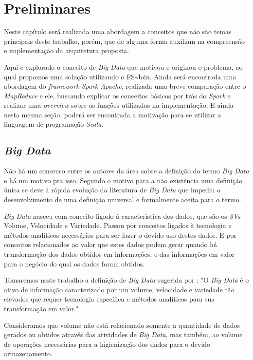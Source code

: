 \chapter{Preliminares}
\label{cap:cap1}

Neste capítulo será realizada uma abordagem a conceitos que não são temas principais deste trabalho, porém, que de alguma forma auxiliam na compreensão e implementação da arquitetura proposta.

Aqui é explorado o conceito de \textit{Big Data} que motivou e originou o problema, ao qual propomos uma solução utilizando o FS-Join. Ainda será encontrada uma abordagem do \textit{framework} \textit{Spark Apache}, realizada uma breve comparação entre o \textit{MapReduce} e ele, buscando explicar os conceitos básicos por trás do \textit{Spark} e realizar uma \textit{overview} sobre as funções utilizadas na implementação. E ainda nesta mesma seção, poderá ser encontrada a motivação para se utilizar a linguagem de programação \textit{Scala}.

\section{\textit{Big Data}}

Não há um consenso entre os autores da área sobre a definição do termo \textit{Big Data} e há um motivo pra isso. Segundo \cite{doi:10.1108/LR-06-2015-0061} o motivo para a não existência uma definição única se deve à rápida evolução da literatura de \textit{Big Data} que impediu o desenvolvimento de uma definição universal e formalmente aceita para o termo.

\textit{Big Data} nasceu com conceito ligado à característica dos dados, que são os \textit{3Vs} -- Volume, Velocidade e Variedade. Passou por conceitos ligados à tecnologia e métodos analíticos necessários para ser fazer o devido uso destes dados. E por conceitos relacionados ao valor que estes dados podem gerar quando há transformação dos dados obtidos em informações, e das informações em valor para o negócio do qual os dados foram obtidos.

Tomaremos neste trabalho a definição de \textit{Big Data} sugerida por \cite{doi:10.1108/LR-06-2015-0061}:  "O \textit{Big Data} é o ativo de informação caracterizado por um volume, velocidade e variedade tão elevados que requer tecnologia específica e métodos analíticos para sua transformação em valor."

Consideramos que volume não está relacionado somente a quantidade de dados gerados ou obtidos através das atividades de \textit{Big Data}, mas também, ao volume de operações necessárias para a higienização dos dados para o devido armazenamento.

